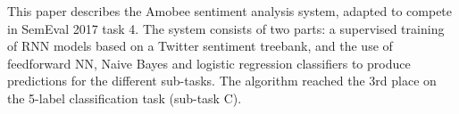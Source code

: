 This paper describes the Amobee sentiment analysis system, adapted to compete in SemEval 2017 task 4. The system consists of two parts: a supervised training of RNN models based on a Twitter sentiment treebank, and the use of feedforward NN, Naive Bayes and logistic regression classifiers to produce predictions for the different sub-tasks. The algorithm reached the 3rd place on the 5-label classification task (sub-task C).
